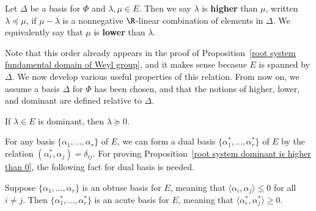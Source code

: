 \begin{definition}
Let $\Delta$ be a basis for $\Phi$ and $\lambda,\mu\in E$. Then we say $\lambda$ is \textbf{higher} than $\mu$, written $\lambda\preceq\mu$, if $\mu-\lambda$ is a nonnegative $\R$-linear combination of elements in $\Delta$. We equivalently say that $\mu$ is \textbf{lower} than $\lambda$.
\end{definition}
Note that this order already appears in the proof of Proposition~\ref{root system fundamental domain of Weyl group}, and it makes sense becasue $E$ is spanned by $\Delta$. We now develop various useful properties of this relation. From now on, we assume a basis $\Delta$ for $\Phi$ has been chosen, and that the notions of higher, lower, and dominant are defined relative to $\Delta$.
\begin{proposition}\label{root system dominant is higher than 0}
If $\lambda\in E$ is dominant, then $\lambda\succeq 0$.
\end{proposition}
For any basis $\{\alpha_1,\dots,\alpha_r\}$ of $E$, we can form a dual basis $\{\alpha_1^*,\dots,\alpha_r^*\}$ of $E$ by the relation $(\alpha_i^*,\alpha_j)=\delta_{ij}$. For proving Proposition~\ref{root system dominant is higher than 0}, the following fact for dual basis is needed.
\begin{lemma}\label{root system dual basis is acute}
Suppose $\{\alpha_1,\dots,\alpha_r\}$ is an obtuse basis for $E$, meaning that $\langle\alpha_i,\alpha_j\rangle\leq 0$ for all $i\neq j$. Then $\{\alpha_1^*,\dots,\alpha_r^*\}$ is an acute basis for $E$, meaning that $\langle\alpha_i^*,\alpha_j^*\rangle\geq 0$.
\end{lemma}
